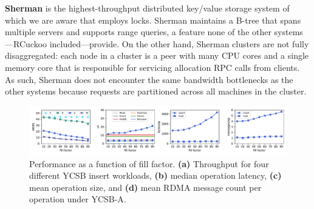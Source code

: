 

\textbf{Sherman} is the highest-throughput distributed key/value
storage system of which we are aware that employs locks.  Sherman
maintains a B-tree that spans multiple servers and supports range
queries, a feature none of the other systems---RCuckoo
included---provide.
On the other
hand, Sherman clusters are not fully disaggregated: each node in a
cluster is a peer with many CPU cores and a single memory core
that is responsible for servicing allocation RPC calls from clients.
As such, Sherman does not encounter the same bandwidth bottlenecks as
the other systems because requests are partitioned across all
machines in the cluster.



\begin{figure}[ht]
    \includegraphics[width=0.99\linewidth]{fig/hero_ycsb_fill.pdf}

    \caption{Performance as a
    function of fill factor. \textbf{(a)} Throughput for four different YCSB insert workloads, \textbf{(b)}
    median operation latency, \textbf{(c)} mean operation size, and \textbf{(d)}
    mean RDMA message count per operation under YCSB-A.}

    \label{fig:ycsb_fill}
\end{figure}

